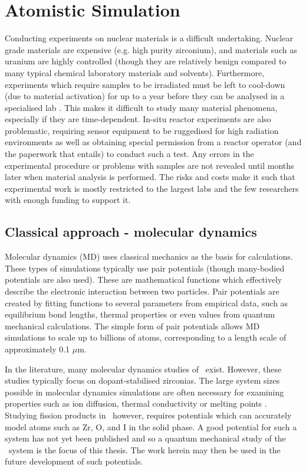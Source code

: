 \section{Atomistic Simulation}

Conducting experiments on nuclear materials is a difficult undertaking. Nuclear grade materials are expensive (e.g. high purity zirconium), and materials such as uranium are highly controlled (though they are relatively benign compared to many typical chemical laboratory materials and solvents). Furthermore, experiments which require samples to be irradiated must be left to cool-down (due to material activation) for up to a year before they can be analysed in a specialised lab \cite{efthymiopoulos2011hiradmat}. This makes it difficult to study many material phenomena, especially if they are time-dependent. In-situ reactor experiments are also problematic, requiring sensor equipment to be ruggedised for high radiation environments as well as obtaining special permission from a reactor operator (and the paperwork that entails) to conduct  such a test. Any errors in the experimental procedure or problems with samples are not revealed until months later when material analysis is performed. The risks and costs make it such that experimental work is mostly restricted to the largest labs and the few researchers with enough funding to support it.



\subsection{Classical approach - molecular dynamics}

Molecular dynamics (MD) uses classical mechanics as the basis for calculations. These types of simulations typically use pair potentials (though many-bodied potentials are also used). These are mathematical functions which effectively describe the electronic interaction between two particles. Pair potentials are created by fitting functions to several parameters from empirical data, such as equilibrium bond lengths, thermal properties or even values from quantum mechanical calculations. The simple form of pair potentials allows MD simulations to scale up to billions of atoms, corresponding to a length scale of approximately 0.1 $\mu$m. 

In the literature, many molecular dynamics studies of \zirconia\ exist. However, these studies typically focus on dopant-stabilised zirconias. The large system sizes possible in molecular dynamics simulations are often necessary for examining properties such as ion diffusion, thermal conductivity or melting points \cite{Davis2010}. Studying fission products in \zirconia\ however, requires potentials which can accurately model atoms such as Zr, O, and I in the solid phase. A good potential for such a system has not yet been published and so a quantum mechanical study of the \zirconia\ system is the focus of this thesis. The work herein may then be used in the future development of such potentials.

